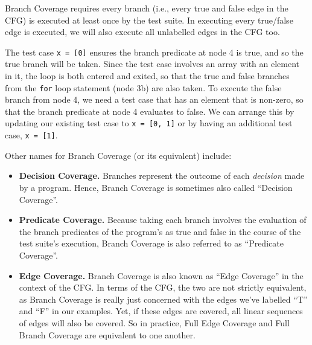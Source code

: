 Branch Coverage requires every branch (i.e., every true and false edge in the
CFG) is executed at least once by the test suite. In executing every true/false
edge is executed, we will also execute all unlabelled edges in the CFG too.

The test case {\tt x = [0]} ensures the branch predicate at node 4 is true, and
so the true branch will be taken. Since the test case involves an array with an
element in it, the loop is both entered and exited, so that the true and false
branches from the {\tt for} loop statement (node 3b) are also taken. To execute
the false branch from node 4, we need a test case that has an element that is
non-zero, so that the branch predicate at node 4 evaluates to false. We can
arrange this by updating our existing test case to {\tt x = [0, 1]} or by having
an additional test case, {\tt x = [1]}.


Other names for Branch Coverage (or its equivalent) include:


\begin{itemize}

    \item {\bf Decision Coverage.} Branches represent the outcome of each {\it
    decision} made by a program. Hence, Branch Coverage is sometimes also called
    ``Decision Coverage''.

    \item {\bf Predicate Coverage.} Because taking each branch involves the
    evaluation of the branch predicates of the program's as true and false in
    the course of the test suite's execution, Branch Coverage is also referred
    to as ``Predicate Coverage''.

    \item {\bf Edge Coverage.} Branch Coverage is also known as ``Edge
    Coverage'' in the context of the CFG. In terms of the CFG, the two are not
    strictly equivalent, as Branch Coverage is really just concerned with the
    edges we've labelled ``T'' and ``F'' in our examples. Yet, if these edges
    are covered, all linear sequences of edges will also be covered. So in
    practice, Full Edge Coverage and Full Branch Coverage are equivalent to one
    another.

\end{itemize}


